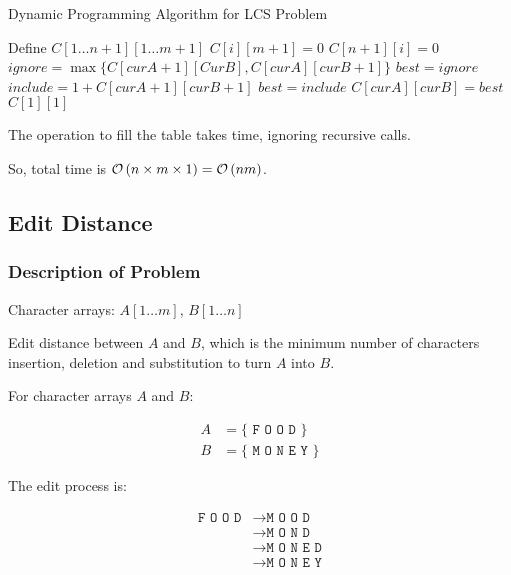 \begin{algorithm}[H]
\caption{Dynamic Programming Algorithm for LCS Problem}\label{dp_lcs_alg}
\begin{algorithmic}[1]
        \State Define $C[1 \ldots n+1][1 \ldots m+1]$
            \State $C[i][m+1]=0$
        \EndFor
            \State $C[n+1][i]=0$
        \EndFor
                \State $ignore = \max\{C[curA+1][CurB], C[curA][curB+1]\}$
                \State $best = ignore$
                    \State $include = 1 + C[curA+1][curB+1]$
                        \State $best = include$
                    \EndIf
                \EndIf
                \State $C[curA][curB] = best$
            \EndFor
        \EndFor
        \Return $C[1][1]$
    \EndProcedure
\end{algorithmic}
\end{algorithm}

The operation to fill the table takes  time, ignoring recursive calls.

So, total time is $\mathcal{O}\left(n\times m\times 1\right) = \mathcal{O}\left(nm\right)$.

\subsection{Edit Distance}

\subsubsection{Description of Problem}

\AlgoInput Character arrays: $A[1 \ldots m]$, $B[1 \ldots n]$

\AlgoOutput Edit distance between $A$ and $B$, which is the minimum number
of characters insertion, deletion and substitution to turn $A$ into $B$.

\AlgoExample For character arrays $A$ and $B$:

\begin{align*}
    A &= \{\texttt{ F O O D }\} \\
    B &= \{\texttt{ M O N E Y }\}
\end{align*}

The edit process is:

\begin{align*}
    \texttt{F O O D} &\rightarrow \texttt{M O O D} \\
                     &\rightarrow \texttt{M O N D} \\
                     &\rightarrow \texttt{M O N E D} \\
                     &\rightarrow \texttt{M O N E Y}
\end{align*}

